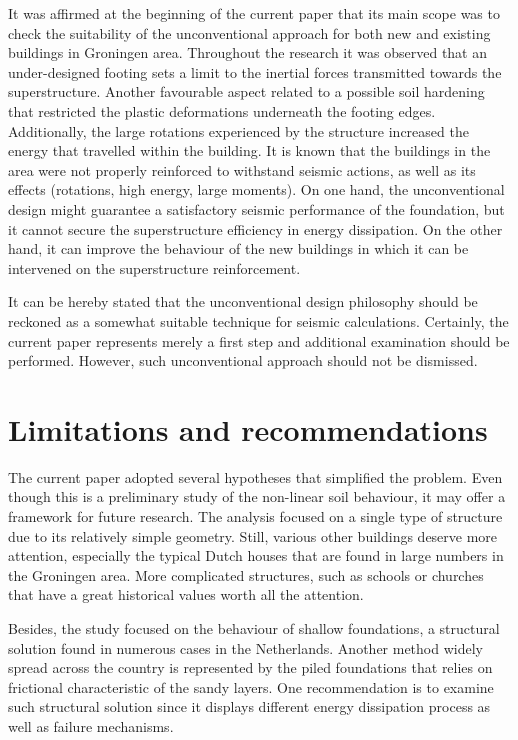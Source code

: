 It was affirmed at the beginning of the current paper that its main scope was to check the suitability of the unconventional approach for both new and existing buildings in Groningen area. Throughout the research it was observed that an under-designed footing sets a limit to the inertial forces transmitted towards the superstructure. Another favourable aspect related to a possible soil hardening that restricted the plastic deformations underneath the footing edges. Additionally, the large rotations experienced by the structure increased the energy that travelled within the building. It is known that the buildings in the area were not properly reinforced to withstand seismic actions, as well as its effects (rotations, high energy, large moments). On one hand, the unconventional design might guarantee a satisfactory seismic performance of the foundation, but it cannot secure the superstructure efficiency in energy dissipation. On the other hand, it can improve the behaviour of the new buildings in which it can be intervened on the superstructure reinforcement.
 
 It can be hereby stated that the unconventional design philosophy should be reckoned as a somewhat suitable technique for seismic calculations. Certainly, the current paper represents merely a first step and additional examination should be performed. However, such unconventional approach should not be dismissed. 
 
 \newpage
\section{Limitations and recommendations}
The current paper adopted several hypotheses that simplified the problem. Even though this is a preliminary study of the non-linear soil behaviour, it may offer a framework for future research. The analysis focused on a single type of structure due to its relatively simple geometry. Still, various other buildings deserve more attention, especially the typical Dutch houses that are found in large numbers in the Groningen area. More complicated structures, such as schools or churches that have a great historical values worth all the attention. 

Besides, the study focused on the behaviour of shallow foundations, a structural solution found in numerous cases in the Netherlands. Another  method widely spread across the country is represented by the piled foundations that relies on frictional characteristic of  the sandy layers. One recommendation is to examine such structural solution since it displays different energy dissipation process as well as failure mechanisms.

